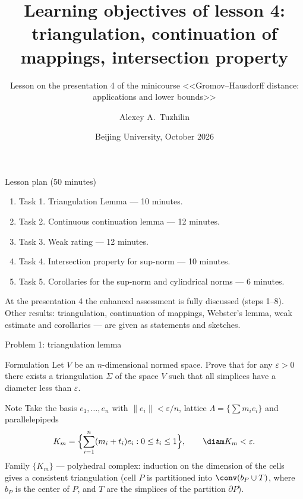 \documentclass[aspectratio=169,11pt]{beamer}
\title[Objectives of lesson 4]{Learning objectives of lesson \textup{4}: triangulation, continuation of mappings, intersection property}
\subtitle{Lesson on the presentation \textup{4} of the minicourse <<Gromov--Hausdorff distance: applications and lower bounds>>}
\author{Alexey A.~Tuzhilin}
\date{Beijing University, October 2026}
\begin{document}
\begin{frame}
\titlepage
\end{frame}

\begin{frame}{Lesson plan (\textup{50} minutes)}
\begin{enumerate}
\item Task \textup{1}. Triangulation Lemma --- \textup{10} minutes.
\item Task \textup{2}. Continuous continuation lemma --- \textup{12} minutes.
\item Task \textup{3}. Weak rating --- \textup{12} minutes.
\item Task \textup{4}. Intersection property for sup-norm --- \textup{10} minutes.
\item Task \textup{5}. Corollaries for the sup-norm and cylindrical norms --- \textup{6} minutes.
\end{enumerate}
\medskip
At the presentation \textup{4} the enhanced assessment is fully discussed \textup{(}steps \textup{1}--\textup{8}\textup{)}. Other results\textup{:} triangulation, continuation of mappings, Webster's lemma, weak estimate and corollaries --- are given as statements and sketches.
\end{frame}

\begin{frame}{Problem \textup{1}: triangulation lemma}
\begin{block}{Formulation}
Let $V$ be an $n$-dimensional normed space. Prove that for any $\varepsilon > 0$ there exists a triangulation $\Sigma$ of the space $V$ such that all simplices have a diameter less than $\varepsilon$.
\end{block}
\begin{block}{Note}
Take the basis $e_1,\dots,e_n$ with $\|e_i\| < \varepsilon/n$, lattice $\Lambda = \{\sum m_i e_i\}$ and parallelepipeds
\[
K_m = \Bigl\{\sum_{i=1}^n (m_i + t_i)e_i : 0 \le t_i \le 1\Bigr\}, \qquad \diam K_m < \varepsilon .
\]
Family $\{K_m\}$ --- polyhedral complex\textup{:} induction on the dimension of the cells gives a consistent triangulation \textup{(}cell $P$ is partitioned into $\conv(b_P \cup T)$, where $b_P$ is the center of $P$, and $T$ are the simplices of the partition $\partial P$\textup{)}.
\end{block}
\end{frame}
\end{document}
